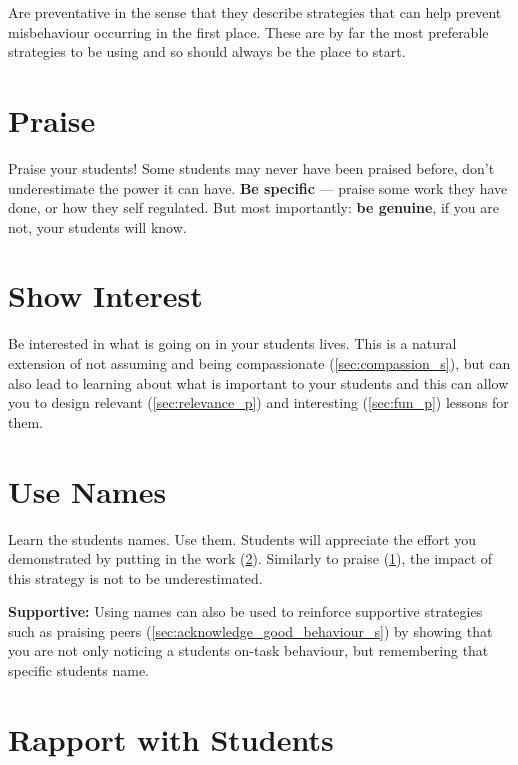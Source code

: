 \documentclass[12pt]{report}
\begin{document}
Are preventative in the sense that they describe strategies that can help prevent misbehaviour occurring in the first place. These are by far the most preferable strategies to be using and so should always be the place to start.

\section{Praise}
\label{sec:praise_p}

Praise your students! Some students may never have been praised before, don't underestimate the power it can have. \textbf{Be specific} --- praise some work they have done, or how they self regulated. But most importantly: \textbf{be genuine}, if you are not, your students will know.



\section{Show Interest}
\label{sec:show_interest_p}

Be interested in what is going on in your students lives. This is a natural extension of not assuming and being compassionate (\ref{sec:compassion_s}), but can also lead to learning about what is important to your students and this can allow you to design relevant (\ref{sec:relevance_p}) and interesting (\ref{sec:fun_p}) lessons for them.



\section{Use Names}
\label{sec:use_names_p}

Learn the students names. Use them. Students will appreciate the effort you demonstrated by putting in the work (\ref{sec:show_interest_p}). Similarly to praise (\ref{sec:praise_p}), the impact of this strategy is not to be underestimated.

\textbf{Supportive:} Using names can also be used to reinforce supportive strategies such as praising peers (\ref{sec:acknowledge_good_behaviour_s}) by showing that you are not only noticing a students on-task behaviour, but remembering that specific students name.



\section{Rapport with Students}
\label{sec:rapport_p}
\end{document}
